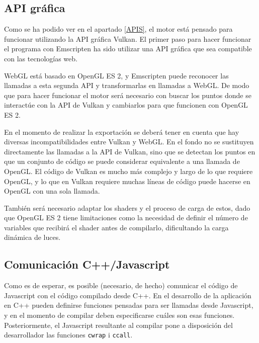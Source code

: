 \subsection{API gráfica}
\label{emscripten_gapi}
Como se ha podido ver en el apartado \ref{APIS}, el motor está pensado para funcionar utilizando la API gráfica Vulkan. El primer paso para hacer funcionar el programa con Emscripten ha sido utilizar una API gráfica que sea compatible con las tecnologías web.

WebGL está basado en OpenGL ES 2, y Emscripten puede reconocer las llamadas a esta segunda API y transformarlas en llamadas a WebGL. De modo que para hacer funcionar el motor será necesario con buscar los puntos donde se interactúe con la API de Vulkan y cambiarlos para que funcionen con OpenGL ES 2.

En el momento de realizar la exportación se deberá tener en cuenta que hay diversas incompatibilidades entre Vulkan y WebGL. En el fondo no se sustituyen directamente las llamadas a la API de Vulkan, sino que se detectan los puntos en que un conjunto de código se puede considerar equivalente a una llamada de OpenGL. El código de Vulkan es mucho más complejo y largo de lo que requiere OpenGL, y lo que en Vulkan requiere muchas líneas de código puede hacerse en OpenGL con una sola llamada.

También será necesario adaptar los shaders y el proceso de carga de estos, dado que OpenGL ES 2 tiene limitaciones como la necesidad de definir el número de variables que recibirá el shader antes de compilarlo, dificultando la carga dinámica de luces.


\subsection{Comunicación C++/Javascript}
\label{emscripten_comm}
Como es de esperar, es posible (necesario, de hecho) comunicar el código de Javascript con el código compilado desde C++. En el desarrollo de la aplicación en C++ pueden definirse funciones pensadas para ser llamadas desde Javascript, y en el momento de compilar deben especificarse cuáles son esas funciones. Posteriormente, el Javascript resultante al compilar pone a disposición del desarrollador las funciones \texttt{cwrap} i \texttt{ccall}.

